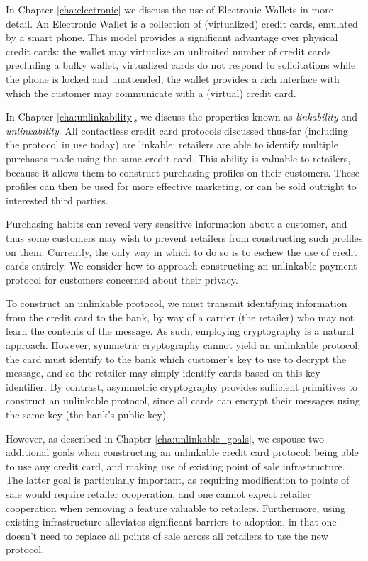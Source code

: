 
In Chapter \ref{cha:electronic} we discuss the use of Electronic Wallets in more detail.
An Electronic Wallet is a collection of (virtualized) credit cards, emulated by a smart phone.
This model provides a significant advantage over physical credit cards:
    the wallet may virtualize an unlimited number of credit cards precluding a bulky wallet,
    virtualized cards do not respond to solicitations while the phone is locked and unattended,
    the wallet provides a rich interface with which the customer may communicate with a (virtual) credit card.


In Chapter \ref{cha:unlinkability}, we discuss the properties known as \emph{linkability} and \emph{unlinkability}.
All contactless credit card protocols discussed thus-far (including the protocol in use today) are linkable:
    retailers are able to identify multiple purchases made using the same credit card.
This ability is valuable to retailers, because it allows them to construct purchasing profiles on their customers.
These profiles can then be used for more effective marketing, or can be sold outright to interested third parties.

Purchasing habits can reveal very sensitive information about a customer,
    and thus some customers may wish to prevent retailers from constructing such profiles on them.
Currently, the only way in which to do so is to eschew the use of credit cards entirely.
We consider how to approach constructing an unlinkable payment protocol for customers concerned about their privacy.

To construct an unlinkable protocol, we must transmit identifying information from the credit card to the bank,
    by way of a carrier (the retailer) who may not learn the contents of the message.
As such, employing cryptography is a natural approach.
However, symmetric cryptography cannot yield an unlinkable protocol:
    the card must identify to the bank which customer's key to use to decrypt the message, and so the retailer may simply identify cards based on this key identifier.
By contrast, asymmetric cryptography provides sufficient primitives to construct an unlinkable protocol, since all cards can encrypt their messages using the same key (the bank's public key).


However, as described in Chapter \ref{cha:unlinkable_goals}, we espouse two additional goals when constructing an unlinkable credit card protocol:
    being able to use any credit card, and making use of existing point of sale infrastructure.
The latter goal is particularly important, as requiring modification to points of sale would require retailer cooperation,
    and one cannot expect retailer cooperation when removing a feature valuable to retailers.
Furthermore, using existing infrastructure alleviates significant barriers to adoption, in that one doesn't need to replace all points of sale across all retailers to use the new protocol.

